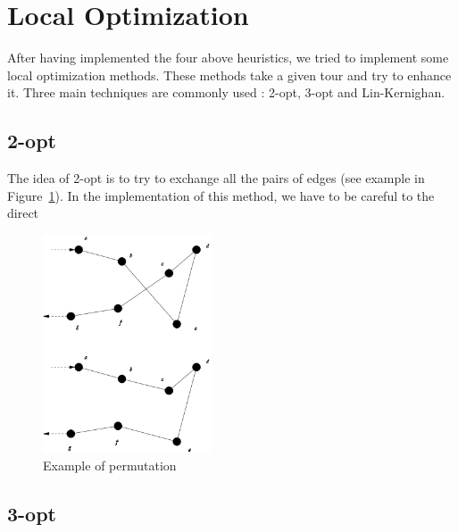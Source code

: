 \section{Local Optimization}

After having implemented the four above heuristics, we tried to implement some local optimization methods. These methods take a given tour and try to enhance it. Three main techniques are commonly used : 2-opt, 3-opt and Lin-Kernighan.

\subsection{2-opt}
 The idea of 2-opt is to try to exchange all the pairs of edges (see example in Figure~\ref{2-opt}). In the implementation of this method, we have to be careful to the direct
 \begin{figure}[!h]
	\begin{center}
		\includegraphics[width=5cm]{images/2opt.png}
		\caption{Example of permutation}
		\label{2-opt}
	\end{center}
\end{figure}

 \subsection{3-opt}
 
 